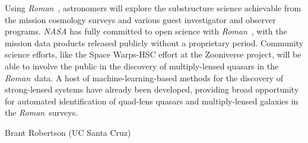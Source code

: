\documentclass[11pt]{article}
\newcommand{\RST}{\emph{Roman}~}
\begin{document}
Using \RST, astronomers
will explore the substructure science achievable from the mission cosmology surveys and various 
guest investigator and observer programs. \emph{NASA} has fully committed to open science with
\RST, with the mission data products released publicly without a proprietary period.
Community science efforts, like the Space Warps-HSC effort at the Zooniverse project\cite{verma2020a},
will be able to involve the public in the discovery of multiply-lensed quasars in the \RST data.
A host of machine-learning-based methods for the discovery of strong-lensed systems have already
been developed\citep{petrillo2019a,madireddy2019a,cheng2020a,canameras2020a}, providing broad
opportunity for automated identification of quad-lens quasars and multiply-lensed galaxies in
the \RST surveys.

\clearpage

\noindent %


\def\apj{\it{ApJ}}                  
\def\apjl{\it{ApJL}}
\def\araa{\it{ARAA}}
\def\mnras{\it{MNRAS}}
\def\nat{\it{Nature}}
\def\prd{\it{Phys. Rev. D}}
\def\prl{\it{Phys. Rev. Lett.}}





\vspace{4in}


Brant Robertson (UC Santa Cruz)
\end{document}
